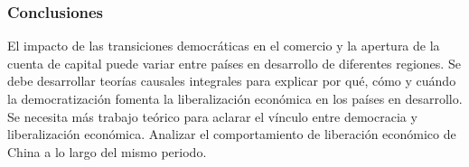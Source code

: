 \documentclass{beamer}
\begin{document}
\begin{frame}
\frametitle{Conclusiones}
El impacto de las transiciones democráticas en el comercio y la apertura de la cuenta de capital puede variar entre países en desarrollo de diferentes regiones.
Se debe desarrollar teorías causales integrales para explicar por qué, cómo y cuándo la democratización fomenta la liberalización económica en los países en desarrollo.
Se necesita más trabajo teórico para aclarar el vínculo entre democracia y liberalización económica.
Analizar el comportamiento de liberación económico de China a lo largo del mismo periodo. 


\end{frame}
\end{document}
